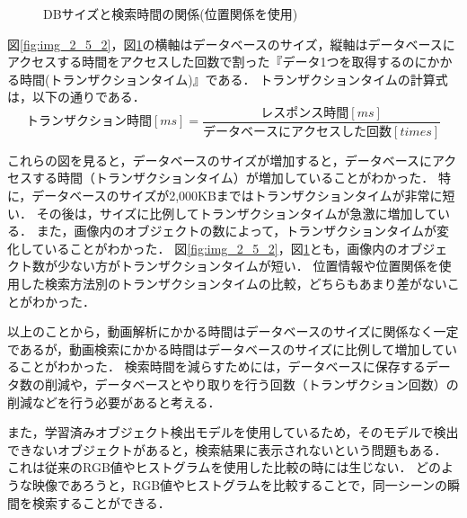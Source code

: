 \documentclass[a4j,12pt,dvipdfmx]{jreport}
\begin{document}
\begin{figure}[t]
  \centering
  \caption{DBサイズと検索時間の関係(位置関係を使用)}
  \label{fig:img_2_5_3}
\end{figure}

図\ref{fig:img_2_5_2}，図\ref{fig:img_2_5_3}の横軸はデータベースのサイズ，縦軸はデータベースにアクセスする時間をアクセスした回数で割った『データ1つを取得するのにかかる時間(トランザクションタイム)』である．
トランザクションタイムの計算式は，以下の通りである．
\begin{equation}
  トランザクション時間[ms] = \frac{レスポンス時間[ms]}{データベースにアクセスした回数[times]}
\end{equation}

これらの図を見ると，データベースのサイズが増加すると，データベースにアクセスする時間（トランザクションタイム）が増加していることがわかった．
特に，データベースのサイズが2,000KBまではトランザクションタイムが非常に短い．
その後は，サイズに比例してトランザクションタイムが急激に増加している．
また，画像内のオブジェクトの数によって，トランザクションタイムが変化していることがわかった．
図\ref{fig:img_2_5_2}，図\ref{fig:img_2_5_3}とも，画像内のオブジェクト数が少ない方がトランザクションタイムが短い．
位置情報や位置関係を使用した検索方法別のトランザクションタイムの比較，どちらもあまり差がないことがわかった．

以上のことから，動画解析にかかる時間はデータベースのサイズに関係なく一定であるが，動画検索にかかる時間はデータベースのサイズに比例して増加していることがわかった．
検索時間を減らすためには，データベースに保存するデータ数の削減や，データベースとやり取りを行う回数（トランザクション回数）の削減などを行う必要があると考える．

また，学習済みオブジェクト検出モデルを使用しているため，そのモデルで検出できないオブジェクトがあると，検索結果に表示されないという問題もある．
これは従来のRGB値やヒストグラムを使用した比較の時には生じない．
どのような映像であろうと，RGB値やヒストグラムを比較することで，同一シーンの瞬間を検索することができる．
\end{document}
